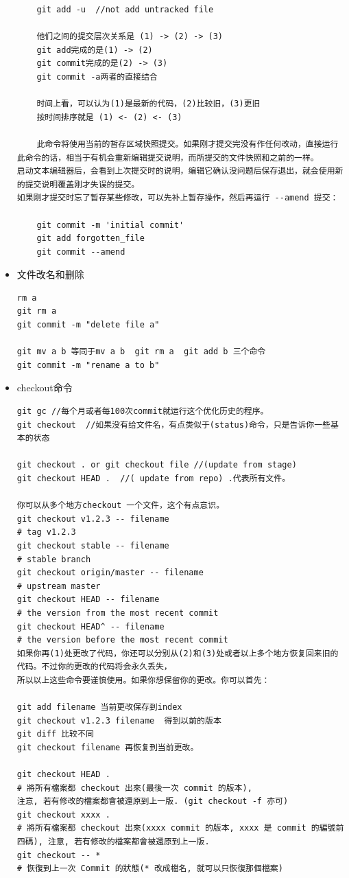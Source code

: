\documentclass[a4paper,12pt,twoside]{book}
\begin{document}
\begin{CJK*}{UTF8}{song}
\begin{itemize}
\begin{verbatim}
    git add -u  //not add untracked file

    他们之间的提交层次关系是 (1) -> (2) -> (3)
    git add完成的是(1) -> (2)
    git commit完成的是(2) -> (3)
    git commit -a两者的直接结合

    时间上看，可以认为(1)是最新的代码，(2)比较旧，(3)更旧
    按时间排序就是 (1) <- (2) <- (3)

    此命令将使用当前的暂存区域快照提交。如果刚才提交完没有作任何改动，直接运行此命令的话，相当于有机会重新编辑提交说明，而所提交的文件快照和之前的一样。
启动文本编辑器后，会看到上次提交时的说明，编辑它确认没问题后保存退出，就会使用新的提交说明覆盖刚才失误的提交。
如果刚才提交时忘了暂存某些修改，可以先补上暂存操作，然后再运行 --amend 提交：

    git commit -m 'initial commit'
    git add forgotten_file
    git commit --amend
    \end{verbatim}

\item 文件改名和删除
\begin{verbatim}
rm a
git rm a
git commit -m "delete file a"

git mv a b 等同于mv a b  git rm a  git add b 三个命令
git commit -m "rename a to b"
\end{verbatim}
\item checkout命令
        \begin{verbatim}
git gc //每个月或者每100次commit就运行这个优化历史的程序。
git checkout  //如果没有给文件名，有点类似于(status)命令，只是告诉你一些基本的状态

git checkout . or git checkout file //(update from stage)
git checkout HEAD .  //( update from repo) .代表所有文件。

你可以从多个地方checkout 一个文件，这个有点意识。
git checkout v1.2.3 -- filename
# tag v1.2.3
git checkout stable -- filename
# stable branch
git checkout origin/master -- filename
# upstream master
git checkout HEAD -- filename
# the version from the most recent commit
git checkout HEAD^ -- filename
# the version before the most recent commit
如果你再(1)处更改了代码，你还可以分别从(2)和(3)处或者以上多个地方恢复回来旧的代码。不过你的更改的代码将会永久丢失，
所以以上这些命令要谨慎使用。如果你想保留你的更改。你可以首先：

git add filename 当前更改保存到index
git checkout v1.2.3 filename  得到以前的版本
git diff 比较不同
git checkout filename 再恢复到当前更改。

git checkout HEAD .
# 將所有檔案都 checkout 出來(最後一次 commit 的版本),
注意, 若有修改的檔案都會被還原到上一版. (git checkout -f 亦可)
git checkout xxxx .
# 將所有檔案都 checkout 出來(xxxx commit 的版本, xxxx 是 commit 的編號前四碼), 注意, 若有修改的檔案都會被還原到上一版.
git checkout -- *
# 恢復到上一次 Commit 的狀態(* 改成檔名, 就可以只恢復那個檔案)


\end{verbatim}
\end{itemize}
\end{CJK*}
\end{document}
